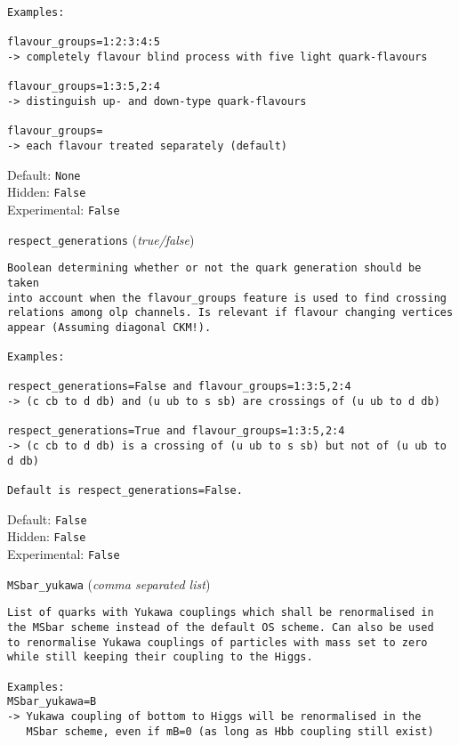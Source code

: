 \begin{basedescript}{\desclabelstyle{\pushlabel}}
\begin{verbatim}
Examples:

flavour_groups=1:2:3:4:5
-> completely flavour blind process with five light quark-flavours

flavour_groups=1:3:5,2:4
-> distinguish up- and down-type quark-flavours

flavour_groups=
-> each flavour treated separately (default)
\end{verbatim}
Default: \verb|None|
\\Hidden: \verb|False|
\\Experimental: \verb|False|
\\\item[\colorbox{gray!30}{\texttt{respect\_generations}}] (\textit{true/false})
\begin{verbatim}
Boolean determining whether or not the quark generation should be taken
into account when the flavour_groups feature is used to find crossing
relations among olp channels. Is relevant if flavour changing vertices
appear (Assuming diagonal CKM!).

Examples:

respect_generations=False and flavour_groups=1:3:5,2:4
-> (c cb to d db) and (u ub to s sb) are crossings of (u ub to d db)

respect_generations=True and flavour_groups=1:3:5,2:4
-> (c cb to d db) is a crossing of (u ub to s sb) but not of (u ub to d db)

Default is respect_generations=False.
\end{verbatim}
Default: \verb|False|
\\Hidden: \verb|False|
\\Experimental: \verb|False|
\\\item[\colorbox{gray!30}{\texttt{MSbar\_yukawa}}] (\textit{comma separated list})
\begin{verbatim}
List of quarks with Yukawa couplings which shall be renormalised in
the MSbar scheme instead of the default OS scheme. Can also be used
to renormalise Yukawa couplings of particles with mass set to zero
while still keeping their coupling to the Higgs.

Examples:
MSbar_yukawa=B
-> Yukawa coupling of bottom to Higgs will be renormalised in the
   MSbar scheme, even if mB=0 (as long as Hbb coupling still exist)


\end{verbatim}
\end{basedescript}
